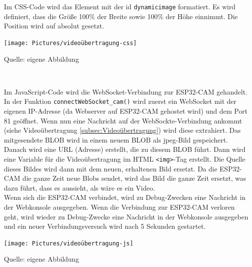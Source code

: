 \documentclass[ngerman,12pt,a4paper]{article}
\begin{document}
			Im CSS-Code wird das Element mit der id \texttt{dynamicimage} formatiert. Es wird definiert, dass die Größe 100\% der Breite sowie 100\% der Höhe einnimmt. Die Position wird auf absolut gesetzt. 
			\noindent
			\begin{center}
				\begin{minipage}[t]{0.43\textwidth}
					\texttt{[image: Pictures/videoübertragung-css]}
					\label{fig:videoübertragung-css}
					\vspace{-10pt}
					\begin{center}
						\par\small Quelle: eigene Abbildung 
					\end{center}
				\end{minipage} \\[0.2cm]
			\end{center}
			Im JavaScript-Code wird die WebSocket-Verbindung zur ESP32-CAM gehandelt. In der Funktion \texttt{connectWebSocket\_cam()} wird zuerst ein WebSocket mit der eigenen IP-Adresse (da Webserver auf ESP32-CAM gehostet wird) und dem Port 81 geöffnet. Wenn nun eine Nachricht auf der WebSockte-Verbindung ankommt (siehe Videoübertragung \ref{subsec:Videoübertragung}) wird diese extrahiert. Das mitgesendete BLOB wird in einem neuem BLOB als jpeg-Bild gespeichert. Danach wird eine URL (Adresse) erstellt, die zu diesem BLOB führt. Dann wird eine Variable für die Videoübertragung im HTML \texttt{<img>}-Tag erstellt. Die Quelle dieses Bildes wird dann mit dem neuen, erhaltenen Bild ersetzt. Da die ESP32-CAM die ganze Zeit neue Blobs sendet, wird das Bild die ganze Zeit ersetzt, was dazu führt, dass es aussieht, als wäre es ein Video. \\[0.1cm]
			Wenn sich die ESP32-CAM verbindet, wird zu Debug-Zwecken eine Nachricht in der Webkonsole ausgegeben. Wenn die Verbindung zur ESP32-CAM verloren geht, wird wieder zu Debug-Zwecke eine Nachricht in der Webkonsole ausgegeben und ein neuer Verbindungsversuch wird nach 5 Sekunden gestartet.
			\begin{center}
				\begin{minipage}[t]{\textwidth}
					\texttt{[image: Pictures/videoübertragung-js]}
					\label{fig:videoübertragung-js}
					\vspace{-10pt}
					\begin{center}
						\par\small Quelle: eigene Abbildung 
					\end{center}
				\end{minipage} \\[0.75cm]
			\end{center}
\end{document}
